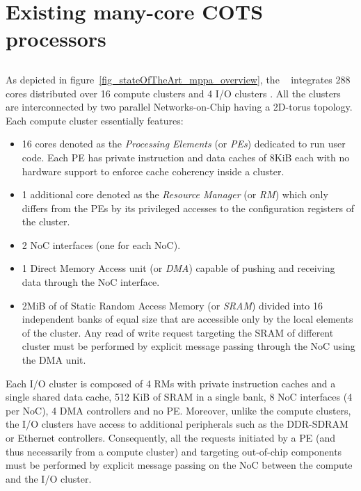 \documentclass[main.tex]{subfiles}
\begin{document}
\chapter{Existing many-core COTS processors}

\section{\mppalong}
As depicted in figure~\ref{fig_stateOfTheArt_mppa_overview}, the \mppalong~\cite{kalray_mppa} integrates 288 cores distributed over 16 compute clusters and 4 I/O clusters . All the clusters are interconnected by two parallel Networks-on-Chip having a 2D-torus topology. %
Each compute cluster essentially features:
\begin{itemize}
    \item 16 cores denoted as the \emph{Processing Elements} (or \emph{PEs}) dedicated to run user code. Each PE has private instruction and data caches of 8KiB each with no hardware support to enforce cache coherency inside a cluster. 
    \item 1 additional core denoted as the \emph{Resource Manager} (or \emph{RM}) which only differs from the PEs by its privileged accesses to the configuration registers of the cluster.
    \item 2 NoC interfaces (one for each NoC).
    \item 1 Direct Memory Access unit (or \emph{DMA}) capable of pushing and receiving data through the NoC interface.
    \item 2MiB of of Static Random Access Memory (or \emph{SRAM}) divided into 16 independent banks of equal size that are accessible only by the local elements of the cluster. Any read of write request targeting the SRAM of different cluster must be performed by explicit message passing through the NoC using the DMA unit.
\end{itemize}

Each I/O cluster is composed of 4 RMs with private instruction caches and a single shared data cache, 512 KiB of SRAM in a single bank, 8 NoC interfaces (4 per NoC), 4 DMA controllers and no PE. Moreover, unlike the compute clusters, the I/O clusters have access to additional peripherals such as the DDR-SDRAM or Ethernet controllers. Consequently, all the requests initiated by a PE (and thus necessarily from a compute cluster) and targeting out-of-chip components must be performed by explicit message passing on the NoC between the compute and the I/O cluster.
\end{document}
